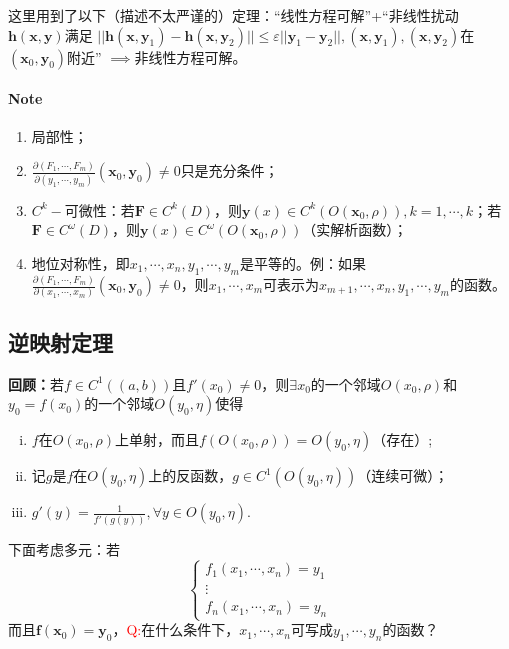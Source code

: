\documentclass[UTF8]{ctexart}
\begin{document}
        这里用到了以下（描述不太严谨的）定理：“线性方程可解”+“非线性扰动$\boldsymbol{h}(\boldsymbol{x},\boldsymbol{y})$满足
        $||\boldsymbol{h}(\boldsymbol{x},\boldsymbol{y}_1)-\boldsymbol{h}(\boldsymbol{x},\boldsymbol{y}_2)||\le\varepsilon||\boldsymbol{y}_1-\boldsymbol{y}_2||,(\boldsymbol{x},\boldsymbol{y}_1),(\boldsymbol{x},\boldsymbol{y}_2)$在$(\boldsymbol{x}_0,\boldsymbol{y}_0)$附近”
        $\implies$非线性方程可解。

        \paragraph{\colorbox{orange!75}{Note}}
        \begin{enumerate}
            \item 局部性；
            \item $\frac{\partial(F_1,\cdots,F_m)}{\partial(y_1,\cdots,y_m)}(\boldsymbol{x}_0,\boldsymbol{y}_0)\not=0$只是充分条件；
            \item $C^k-$可微性：若$\boldsymbol{F}\in C^k(D)$，则$\boldsymbol{y}(x)\in C^k(O(\boldsymbol{x}_0,\rho)),k=1,\cdots,k$；若$\boldsymbol{F}\in C^\omega(D)$，则$\boldsymbol{y}(x)\in C^\omega(O(\boldsymbol{x}_0,\rho))$（实解析函数）；
            \item 地位对称性，即$x_1,\cdots,x_n,y_1,\cdots,y_m$是平等的。例：如果$\frac{\partial(F_1,\cdots,F_m)}{\partial (x_1,\cdots,x_m)}(\boldsymbol{x}_0,\boldsymbol{y}_0)\not=0$，则$x_1,\cdots,x_m$可表示为$x_{m+1},\cdots,x_n,y_1,\cdots,y_m$的函数。
        \end{enumerate}

    \subsection{逆映射定理}
    \textbf{回顾：}若$f\in C^1((a,b))$且$f'(x_0)\not=0$，则$\exists x_0$的一个邻域$O(x_0,\rho)$和$y_0=f(x_0)$的一个邻域$O(y_0,\eta)$使得
    \begin{enumerate}[(i)]
        \item $f$在$O(x_0,\rho)$上单射，而且$f(O(x_0,\rho))=O(y_0,\eta)$（存在）;
        \item 记$g$是$f$在$O(y_0,\eta)$上的反函数，$g\in C^1(O(y_0,\eta))$（连续可微）；
        \item $g'(y)=\frac{1}{f'(g(y))},\forall y\in O(y_0,\eta)$.
    \end{enumerate}

    下面考虑多元：若
    $$\begin{cases}
        f_1(x_1,\cdots,x_n)=y_1\\
        \vdots\\
        f_n(x_1,\cdots,x_n)=y_n
    \end{cases}$$
    而且$\boldsymbol{f}(\boldsymbol{x}_0)=\boldsymbol{y}_0$，\textcolor{red}{Q:}在什么条件下，$x_1,\cdots,x_n$可写成$y_1,\cdots,y_n$的函数？
\end{document}

